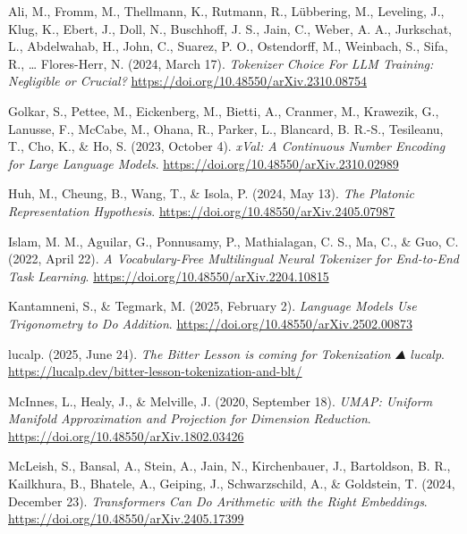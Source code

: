 \documentclass[
  a4paper, twoside, 10pt, titlepage]{book}
\newlength{\cslhangindent}
\newenvironment{CSLReferences}[2] %
 {\begin{list}{}{%
  \setlength{\itemindent}{0pt}
  \setlength{\leftmargin}{0pt}
  \setlength{\parsep}{0pt}
  \ifodd #1
   \setlength{\leftmargin}{\cslhangindent}
   \setlength{\itemindent}{-1\cslhangindent}
  \fi
  \setlength{\itemsep}{#2\baselineskip}}}
 {\end{list}}
\begin{document}
\label{refs}
\begin{CSLReferences}{1}{0}
Ali, M., Fromm, M., Thellmann, K., Rutmann, R., Lübbering, M., Leveling,
J., Klug, K., Ebert, J., Doll, N., Buschhoff, J. S., Jain, C., Weber, A.
A., Jurkschat, L., Abdelwahab, H., John, C., Suarez, P. O., Ostendorff,
M., Weinbach, S., Sifa, R., \ldots{} Flores-Herr, N. (2024, March 17).
\emph{Tokenizer {Choice For LLM Training}: {Negligible} or {Crucial}?}
\url{https://doi.org/10.48550/arXiv.2310.08754}

Golkar, S., Pettee, M., Eickenberg, M., Bietti, A., Cranmer, M.,
Krawezik, G., Lanusse, F., McCabe, M., Ohana, R., Parker, L., Blancard,
B. R.-S., Tesileanu, T., Cho, K., \& Ho, S. (2023, October 4).
\emph{{xVal}: {A Continuous Number Encoding} for {Large Language
Models}}. \url{https://doi.org/10.48550/arXiv.2310.02989}

Huh, M., Cheung, B., Wang, T., \& Isola, P. (2024, May 13). \emph{The
{Platonic Representation Hypothesis}}.
\url{https://doi.org/10.48550/arXiv.2405.07987}

Islam, M. M., Aguilar, G., Ponnusamy, P., Mathialagan, C. S., Ma, C., \&
Guo, C. (2022, April 22). \emph{A {Vocabulary-Free Multilingual Neural
Tokenizer} for {End-to-End Task Learning}}.
\url{https://doi.org/10.48550/arXiv.2204.10815}

Kantamneni, S., \& Tegmark, M. (2025, February 2). \emph{Language
{Models Use Trigonometry} to {Do Addition}}.
\url{https://doi.org/10.48550/arXiv.2502.00873}

lucalp. (2025, June 24). \emph{The {Bitter Lesson} is coming for
{Tokenization} \textbar{} ⛰️ lucalp}.
\url{https://lucalp.dev/bitter-lesson-tokenization-and-blt/}

McInnes, L., Healy, J., \& Melville, J. (2020, September 18).
\emph{{UMAP}: {Uniform Manifold Approximation} and {Projection} for
{Dimension Reduction}}. \url{https://doi.org/10.48550/arXiv.1802.03426}

McLeish, S., Bansal, A., Stein, A., Jain, N., Kirchenbauer, J.,
Bartoldson, B. R., Kailkhura, B., Bhatele, A., Geiping, J.,
Schwarzschild, A., \& Goldstein, T. (2024, December 23).
\emph{Transformers {Can Do Arithmetic} with the {Right Embeddings}}.
\url{https://doi.org/10.48550/arXiv.2405.17399}


\end{CSLReferences}
\end{document}
